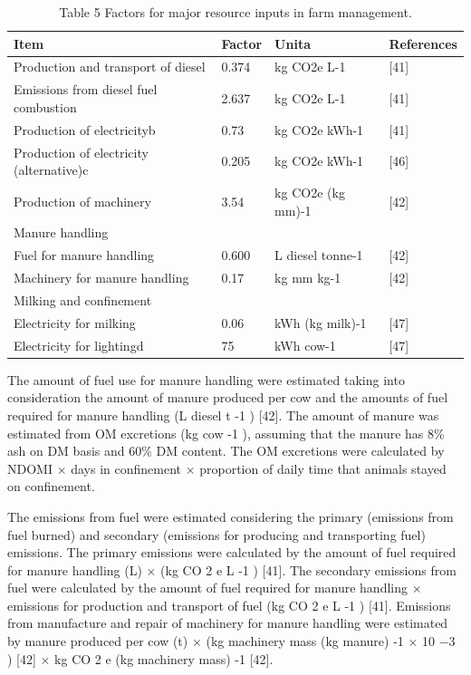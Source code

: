 \documentclass[11pt,a4paper]{article}
\begin{document}
\begin{table}[h]
\caption{Table 5 Factors for major resource inputs in farm management.}
\begin{tabular}{|l|l|l|l|}
\hline
Item & Factor & Unita & References \\ \hline
Production and transport of diesel & 0.374 & kg CO2e L-1 & [41] \\ \hline
Emissions from diesel fuel combustion & 2.637 & kg CO2e L-1 & [41] \\ \hline
Production of electricityb & 0.73 & kg CO2e kWh-1 & [41] \\ \hline
Production of electricity (alternative)c & 0.205 & kg CO2e kWh-1 & [46] \\ \hline
Production of machinery & 3.54 & kg CO2e (kg mm)-1 & [42] \\ \hline
Manure handling &  &  &  \\ \hline
Fuel for manure handling & 0.600 & L diesel tonne-1 & [42] \\ \hline
Machinery for manure handling & 0.17 & kg mm kg-1 & [42] \\ \hline
Milking and confinement &  &  &  \\ \hline
Electricity for milking & 0.06 & kWh (kg milk)-1 & [47] \\ \hline
Electricity for lightingd & 75 & kWh cow-1 & [47] \\ \hline
\end{tabular}
\end{table}

The amount of fuel use for manure handling were estimated taking into consideration the amount of manure produced per cow and the amounts of fuel required for manure handling (L diesel t -1 ) [42]. The amount of manure was estimated from OM excretions (kg cow -1 ), assuming that the manure has 8\% ash on DM basis and 60\% DM content. The OM excretions were calculated by NDOMI × days in confinement × proportion of daily time that animals stayed on confinement.

The emissions from fuel were estimated considering the primary (emissions from fuel burned) and secondary (emissions for producing and transporting fuel) emissions. The primary emissions were calculated by the amount of fuel required for manure handling (L) × (kg CO 2 e L -1 ) [41]. The secondary emissions from fuel were calculated by the amount of fuel required for manure handling × emissions for production and transport of fuel (kg CO 2 e L -1 ) [41]. Emissions from manufacture and repair of machinery for manure handling were estimated by manure produced per cow (t) × (kg machinery mass (kg manure) -1 × 10 −3 ) [42] × kg CO 2 e (kg machinery mass) -1 [42].
\end{document}
